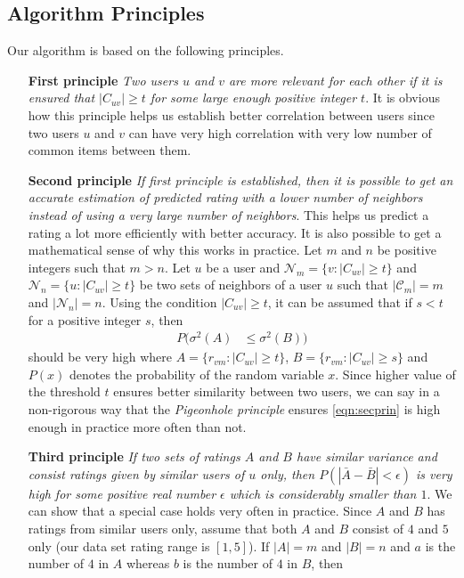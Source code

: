 \documentclass{article}
\begin{document}
	\subsection{Algorithm Principles}
	Our algorithm is based on the following principles.
		\begin{enumerate}
			\item[\bfseries First principle] \textit{Two users $u$ and $v$ are more relevant for each other if it is ensured that $|C_{uv}|\geq t$ for some large enough positive integer $t$}. It is obvious how this principle helps us establish better correlation between users since two users $u$ and $v$ can have very high correlation with very low number of common items between them.
			\item[\bfseries Second principle] \textit{If first principle is established, then it is possible to get an accurate estimation of predicted rating with a lower number of neighbors instead of using a very large number of neighbors}. This helps us predict a rating a lot more efficiently with better accuracy. It is also possible to get a mathematical sense of why this works in practice. Let $m$ and $n$ be positive integers such that $m>n$. Let $u$ be a user and $\mathcal{N}_{m}=\{v:|C_{uv}|\geq t\}$ and $\mathcal{N}_{n}=\{u:|C_{uv}|\geq t\}$ be two sets of neighbors of a user $u$ such that $|\mathcal{C}_{m}|=m$ and $|\mathcal{N}_{n}|=n$. Using the condition $|C_{uv}|\geq t$, it can be assumed that if $s<t$ for a positive integer $s$, then
				\begin{align}
					P(\sigma^{2}(A)
						& \leq \sigma^{2}(B))\label{eqn:secprin}
				\end{align}
			should be very high where $A=\{r_{vm}:|C_{uv}|\geq t\}$, $B=\{r_{vm}:|C_{uv}|\geq s\}$ and $P(x)$ denotes the probability of the random variable $x$. Since higher value of the threshold $t$ ensures better similarity between two users, we can say in a non-rigorous way that the \textit{Pigeonhole principle} ensures \eqref{eqn:secprin} is high enough in practice more often than not.
			\item[\bfseries Third principle] \textit{If two sets of ratings $A$ and $B$ have similar variance and consist ratings given by similar users of $u$ only, then $P(|\bar{A}-\bar{B}|<\epsilon)$ is very high for some positive real number $\epsilon$ which is considerably smaller than $1$}. We can show that a special case holds very often in practice. Since $A$ and $B$ has ratings from similar users only, assume that both $A$ and $B$ consist of $4$ and $5$ only (our data set rating range is $[1,5]$). If $|A|=m$ and $|B|=n$ and $a$ is the number of $4$ in $A$ whereas $b$ is the number of $4$ in $B$, then

\end{enumerate}
\end{document}
